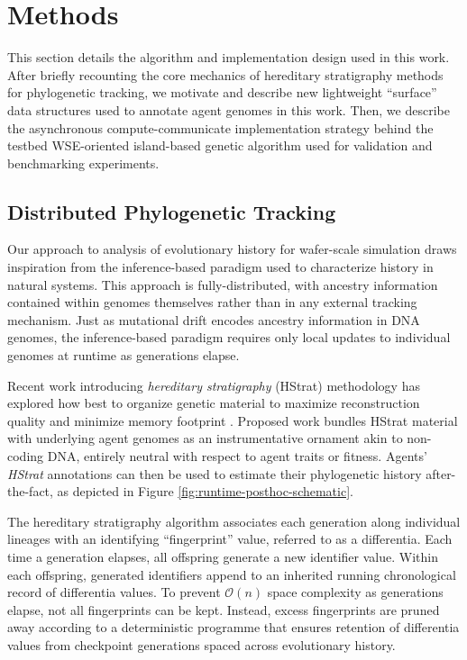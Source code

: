 \section{Methods} \label{sec:methods}

This section details the algorithm and implementation design used in this work.
After briefly recounting the core mechanics of hereditary stratigraphy methods for phylogenetic tracking, we motivate and describe new lightweight ``surface'' data structures used to annotate agent genomes in this work.
Then, we describe the asynchronous compute-communicate implementation strategy behind the testbed WSE-oriented island-based genetic algorithm used for validation and benchmarking experiments.



\subsection{Distributed Phylogenetic Tracking}

Our approach to analysis of evolutionary history for wafer-scale simulation draws inspiration from the inference-based paradigm used to characterize history in natural systems.
This approach is fully-distributed, with ancestry information contained within genomes themselves rather than in any external tracking mechanism.
Just as mutational drift encodes ancestry information in DNA genomes, the inference-based paradigm requires only local updates to individual genomes at runtime as generations elapse.

Recent work introducing \textit{hereditary stratigraphy} (HStrat) methodology has explored how best to organize genetic material to maximize reconstruction quality and minimize memory footprint \citep{moreno2022hstrat, moreno2022hereditary}.
Proposed work bundles HStrat material with underlying agent genomes as an instrumentative ornament akin to non-coding DNA, entirely neutral with respect to agent traits or fitness.
Agents' \textit{HStrat} annotations can then be used to estimate their phylogenetic history after-the-fact, as depicted in Figure \ref{fig:runtime-posthoc-schematic}.

The hereditary stratigraphy algorithm associates each generation along individual lineages with an identifying ``fingerprint'' value, referred to as a differentia.
Each time a generation elapses, all offspring generate a new identifier value.
Within each offspring, generated identifiers append to an inherited running chronological record of differentia values.
To prevent $\mathcal{O}(n)$ space complexity as generations elapse, not all fingerprints can be kept.
Instead, excess fingerprints are pruned away according to a deterministic programme that ensures retention of differentia values from checkpoint generations spaced across evolutionary history.

